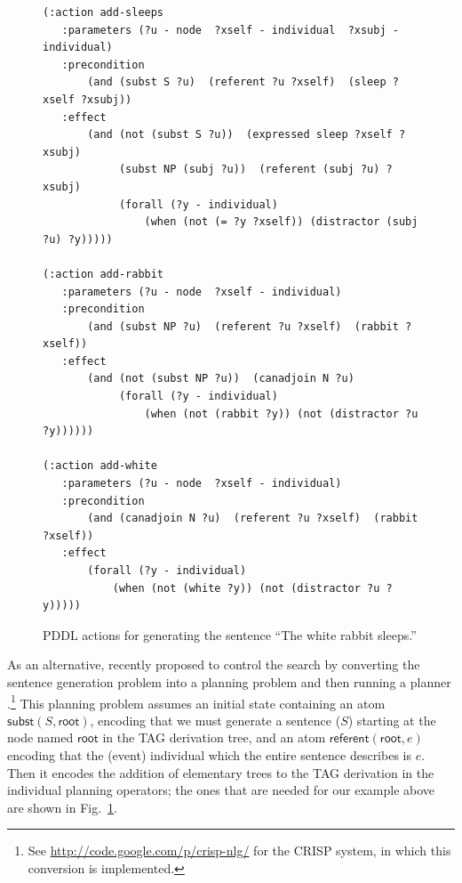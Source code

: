 \begin{figure}
\centering
\begin{minipage}{0.8\textwidth}
{\small%
\begin{verbatim}
(:action add-sleeps
   :parameters (?u - node  ?xself - individual  ?xsubj - individual)
   :precondition
       (and (subst S ?u)  (referent ?u ?xself)  (sleep ?xself ?xsubj))
   :effect 
       (and (not (subst S ?u))  (expressed sleep ?xself ?xsubj)
            (subst NP (subj ?u))  (referent (subj ?u) ?xsubj)
            (forall (?y - individual)
                (when (not (= ?y ?xself)) (distractor (subj ?u) ?y)))))

(:action add-rabbit
   :parameters (?u - node  ?xself - individual)
   :precondition 
       (and (subst NP ?u)  (referent ?u ?xself)  (rabbit ?xself))
   :effect 
       (and (not (subst NP ?u))  (canadjoin N ?u)
            (forall (?y - individual)
                (when (not (rabbit ?y)) (not (distractor ?u ?y))))))

(:action add-white
   :parameters (?u - node  ?xself - individual)
   :precondition 
       (and (canadjoin N ?u)  (referent ?u ?xself)  (rabbit ?xself))
   :effect 
       (forall (?y - individual)
           (when (not (white ?y)) (not (distractor ?u ?y)))))
\end{verbatim}}%
\end{minipage}
\caption{PDDL actions for generating the sentence ``The white rabbit
sleeps.''}
\label{fig:white-rabbit-as-planning}
\end{figure}

As an alternative, \citet{KolSto07} recently proposed to control the
search by converting the sentence generation problem into a planning
problem and then running a planner \citet{KolSto07}.\footnote{See
  \url{http://code.google.com/p/crisp-nlg/} for the CRISP system, in
  which this conversion is implemented.} This planning problem assumes
an initial state containing an atom $\mathsf{subst}(S,\mathsf{root})$,
encoding that we must generate a sentence ($S$) starting at the node
named $\mathsf{root}$ in the TAG derivation tree, and an atom
$\mathsf{referent}(\mathsf{root},e)$ encoding that the (event)
individual which the entire sentence describes is $e$. Then it encodes
the addition of elementary trees to the TAG derivation in the
individual planning operators; the ones that are needed for our
example above are shown in
Fig.~\ref{fig:white-rabbit-as-planning}.

